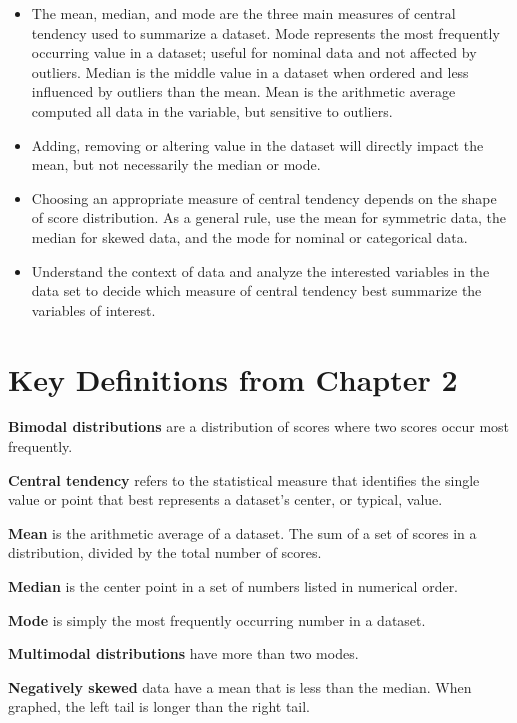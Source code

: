 \documentclass[
  letterpaper,
  DIV=11,
  numbers=noendperiod]{scrreprt}
\begin{document}
\begin{itemize}
\item
  The mean, median, and mode are the three main measures of central
  tendency used to summarize a dataset. Mode represents the most
  frequently occurring value in a dataset; useful for nominal data and
  not affected by outliers. Median is the middle value in a dataset when
  ordered and less influenced by outliers than the mean. Mean is the
  arithmetic average computed all data in the variable, but sensitive to
  outliers.
\item
  Adding, removing or altering value in the dataset will directly impact
  the mean, but not necessarily the median or mode.
\item
  Choosing an appropriate measure of central tendency depends on the
  shape of score distribution. As a general rule, use the mean for
  symmetric data, the median for skewed data, and the mode for nominal
  or categorical data.
\item
  Understand the context of data and analyze the interested variables in
  the data set to decide which measure of central tendency best
  summarize the variables of interest.
\end{itemize}

\section*{Key Definitions from Chapter
2}\label{key-definitions-from-chapter-2}


\textbf{Bimodal distributions} are a distribution of scores where two
scores occur most frequently.

\textbf{Central tendency} refers to the statistical measure that
identifies the single value or point that best represents a dataset's
center, or typical, value.

\textbf{Mean} is the arithmetic average of a dataset. The sum of a set
of scores in a distribution, divided by the total number of scores.

\textbf{Median} is the center point in a set of numbers listed in
numerical order.

\textbf{Mode} is simply the most frequently occurring number in a
dataset.

\textbf{Multimodal distributions} have more than two modes.

\textbf{Negatively skewed} data have a mean that is less than the
median. When graphed, the left tail is longer than the right tail.
\end{document}

